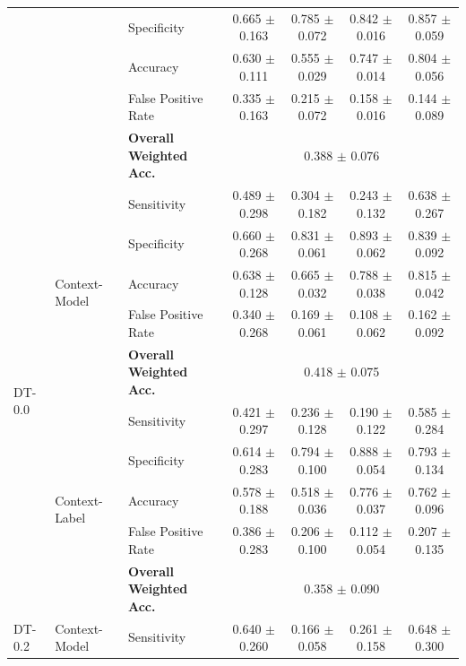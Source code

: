 \begin{table}[ht]
\begin{tabular}{l|llcccc}
  &   & Specificity            & 0.665 $\pm$ 0.163 & 0.785 $\pm$ 0.072 & 0.842 $\pm$ 0.016 & 0.857 $\pm$ 0.059 \\
  &   & Accuracy               & 0.630 $\pm$ 0.111 & 0.555 $\pm$ 0.029 & 0.747 $\pm$ 0.014 & 0.804 $\pm$ 0.056 \\
  &   & False Positive Rate    & 0.335 $\pm$ 0.163 & 0.215 $\pm$ 0.072 & 0.158 $\pm$ 0.016 & 0.144 $\pm$ 0.089 \\
  &   & \textbf{Overall Weighted Acc.}
                                & \multicolumn{4}{c}{0.388 $\pm$ 0.076} \\ \midrule

\multirow{10}{*}{DT-0.0}
  & \multirow{5}{*}{Context-Model}
      & Sensitivity            & 0.489 $\pm$ 0.298 & 0.304 $\pm$ 0.182 & 0.243 $\pm$ 0.132 & 0.638 $\pm$ 0.267 \\
  &   & Specificity            & 0.660 $\pm$ 0.268 & 0.831 $\pm$ 0.061 & 0.893 $\pm$ 0.062 & 0.839 $\pm$ 0.092 \\
  &   & Accuracy               & 0.638 $\pm$ 0.128 & 0.665 $\pm$ 0.032 & 0.788 $\pm$ 0.038 & 0.815 $\pm$ 0.042 \\
  &   & False Positive Rate    & 0.340 $\pm$ 0.268 & 0.169 $\pm$ 0.061 & 0.108 $\pm$ 0.062 & 0.162 $\pm$ 0.092 \\
  &   & \textbf{Overall Weighted Acc.}
                                & \multicolumn{4}{c}{0.418 $\pm$ 0.075} \\ \cmidrule{2-7}
  & \multirow{5}{*}{Context-Label}
      & Sensitivity            & 0.421 $\pm$ 0.297 & 0.236 $\pm$ 0.128 & 0.190 $\pm$ 0.122 & 0.585 $\pm$ 0.284 \\
  &   & Specificity            & 0.614 $\pm$ 0.283 & 0.794 $\pm$ 0.100 & 0.888 $\pm$ 0.054 & 0.793 $\pm$ 0.134 \\
  &   & Accuracy               & 0.578 $\pm$ 0.188 & 0.518 $\pm$ 0.036 & 0.776 $\pm$ 0.037 & 0.762 $\pm$ 0.096 \\
  &   & False Positive Rate    & 0.386 $\pm$ 0.283 & 0.206 $\pm$ 0.100 & 0.112 $\pm$ 0.054 & 0.207 $\pm$ 0.135 \\
  &   & \textbf{Overall Weighted Acc.}
                                & \multicolumn{4}{c}{0.358 $\pm$ 0.090} \\ \midrule
\multirow{10}{*}{DT-0.2}
  & \multirow{5}{*}{Context-Model}
      & Sensitivity            & 0.640 $\pm$ 0.260 & 0.166 $\pm$ 0.058 & 0.261 $\pm$ 0.158 & 0.648 $\pm$ 0.300 \\

\end{tabular}
\end{table}
